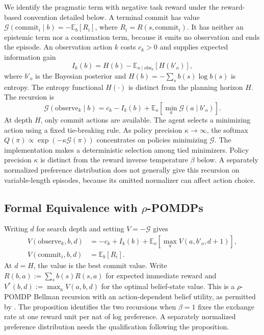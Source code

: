 \documentclass[runningheads]{llncs}
\begin{document}
We identify the pragmatic term with negative task reward under the reward-based convention detailed below. A terminal commit has value $\mathcal G(\mathrm{commit}_i\mid b)=-\mathbb E_b[R_i]$, where $R_i=R(s,\mathrm{commit}_i)$. It has neither an epistemic term nor a continuation term, because it emits no observation and ends the episode. An observation action $k$ costs $c_k>0$ and supplies expected information gain
\[
I_k(b)=H(b)-\mathbb E_{o\mid\mathrm{obs}_k}[H(b'_o)],
\]
where $b'_o$ is the Bayesian posterior and $H(b)=-\sum_s b(s)\log b(s)$ is entropy. The entropy functional $H(\cdot)$ is distinct from the planning horizon $H$. The recursion is
\begin{equation}
\mathcal G(\mathrm{observe}_k\mid b)=c_k-I_k(b)+\mathbb E_o\!\left[\min_a\mathcal G(a\mid b'_o)\right].
\label{eq:efe_recursive}
\end{equation}
At depth $H$, only commit actions are available. The agent selects a minimizing action using a fixed tie-breaking rule. As policy precision $\kappa\to\infty$, the softmax $Q(\pi)\propto\exp(-\kappa\mathcal G(\pi))$ concentrates on policies minimizing $\mathcal G$. The implementation makes a deterministic selection among tied minimizers. Policy precision $\kappa$ is distinct from the reward inverse temperature $\beta$ below. A separately normalized preference distribution does not generally give this recursion on variable-length episodes, because its omitted normalizer can affect action choice.

\subsection{Formal Equivalence with $\rho$-POMDPs}
\label{subsec:formal_rho_equiv}

Writing $d$ for search depth and setting $V=-\mathcal G$ gives
\begin{align}
V(\mathrm{observe}_k,b,d)&=-c_k+I_k(b)+\mathbb E_o\!\left[\max_a V(a,b'_o,d+1)\right],\label{eq:bellman_obs}\\
V(\mathrm{commit}_i,b,d)&=\mathbb E_b[R_i].\label{eq:bellman_commit}
\end{align}
At $d=H$, the value is the best commit value. Write $R(b,a):=\sum_s b(s)R(s,a)$ for expected immediate reward and $V^*(b,d):=\max_a V(a,b,d)$ for the optimal belief-state value. This is a $\rho$-POMDP Bellman recursion with an action-dependent belief utility, as permitted by \citet{araya2010}. The proposition identifies the two recursions when $\beta=1$ fixes the exchange rate at one reward unit per nat of log preference. A separately normalized preference distribution needs the qualification following the proposition.
\end{document}
